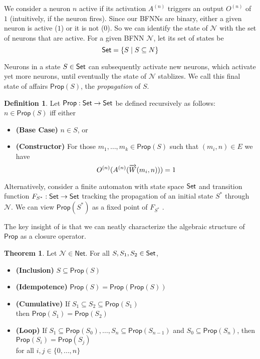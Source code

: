 \documentclass[letterpaper]{article}
\newcommand{\Set}{\mbox{\sf Set}}
\theoremstyle{definition}
\newtheorem{definition}{Definition}
\newtheorem{theorem}{Theorem}
\newcommand{\set}[1]{\{ #1 \}}
\newcommand{\Prop}{\textsf{Prop}}
\newcommand{\AllNets}{\mathsf{Net}}
\newcommand{\Net}{\mathcal{N}}
\begin{document}
We consider a neuron $n$ active if its activation $A^{(n)}$ triggers an output $O^{(n)}$ of $1$ (intuitively, if the neuron fires).  Since our BFNNs are binary, either a given neuron is active ($1$) or it is not ($0$).  So we can identify the state of $\Net$ with the set of neurons that are active.  For a given BFNN $\Net$, let its set of states be
\[
    \Set = \set{S \mid S \subseteq N}
\]

Neurons in a state $S \in \Set$ can subsequently activate new neurons, which activate yet more neurons, until eventually the state of $\Net$ stablizes.  We call this final state of affairs $\Prop(S)$, the \emph{propagation} of $S$.

\begin{definition}
Let $\Prop : \Set \to \Set$ be defined recursively as follows:  $n \in \Prop(S)$ iff either
\begin{itemize}
    \item[] \textbf{(Base Case)} $n \in S$, or
    \item[] \textbf{(Constructor)} For those $m_1, \ldots, m_k \in \Prop(S)$ such that $(m_i, n) \in E$ we have
    \[
    O^{(n)}(A^{(n)}(\smash{\overrightarrow{W}}(m_i, n))) = 1
    \]
\end{itemize}
\end{definition}

Alternatively, consider a finite automaton with state space $\Set$ and transition function $F_{S^\ast} : \Set \to \Set$ tracking the propagation of an initial state $S^\ast$ through $\Net$.  We can view $\Prop(S^\ast)$ as a fixed point of $F_{S^\ast}$ \cite{leitgeb2001nonmonotonic}.

The key insight of \cite{leitgeb2001nonmonotonic} is that we can neatly characterize the algebraic structure of $\Prop$ as a closure operator.

\begin{theorem}
Let $\Net \in \AllNets$.  For all $S, S_1, S_2 \in \Set$,
\begin{itemize}
    \item \textbf{(Inclusion)} $S \subseteq \Prop(S)$
    
    \item \textbf{(Idempotence)} $\Prop(S) = \Prop(\Prop(S))$
    
    \item \textbf{(Cumulative)} If ${S_1 \subseteq S_2 \subseteq \Prop(S_1)}$\\ then ${\Prop(S_1) = \Prop(S_2)}$
    
    \item \textbf{(Loop)} If ${S_1 \subseteq \Prop(S_0)}, \ldots, {S_n \subseteq \Prop(S_{n-1})}$ and ${S_0 \subseteq \Prop(S_n)}$, then ${\Prop(S_i) = \Prop(S_j)}$\\
    for all $i, j \in \set{0, \ldots, n}$
\end{itemize}
\end{theorem}
\end{document}
